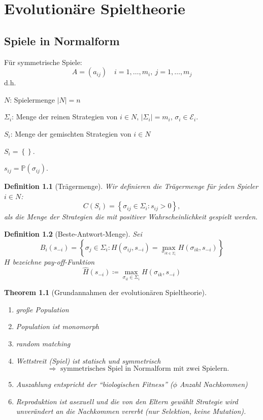 \documentclass[12pt]{extreport} %
\theoremstyle{named}
\newtheorem{unnamedtheorem}{Theorem} \counterwithin{unnamedtheorem}{chapter}
\theoremstyle{itshape}
\newtheorem*{definition}{Definition}
\theoremstyle{normal}
\begin{document}
\chapter{Evolutionäre Spieltheorie}

  
\section{Spiele in Normalform}
Für symmetrische Spiele:
$$ A = \left( a_{ij} \right) \quad i = 1, \dotsc, m_{i}, ~ j = 1, \dotsc, m_{j} $$
d.h.
\begin{description}
	\item $N$: Spielermenge $|N| = n$
	\item $\Sigma_{i}$: Menge der reinen Strategien von $i \in N$, $\left| \Sigma_{i} \right| = m_{i}$, $\sigma_{i} \in \mathcal{E}_{i}$.
	\item $S_{i}$: Menge der gemischten Strategien von $i \in N$
		\begin{description}
			\item $S_{i} = \left\{ \right\}$.
			\item $s_{ij} = \mathds{P}(\sigma_{ij})$.
		\end{description}
\end{description}
  
\begin{definition}[Trägermenge] Wir definieren die Trägermenge für jeden Spieler $i \in N$:
	$$ C(S_{i}) = \left\{ \sigma_{ij} \in \Sigma_{i} : s_{ij} > 0 \right\}, $$
	als die Menge der Strategien die mit positiver Wahrscheinlichkeit gespielt werden.
\end{definition}  

\begin{definition}[Beste-Antwort-Menge] Sei
	$$ B_{i}(s_{-i}) = \left\{ \sigma_{j} \in \Sigma_{i} : H(\sigma_{ij}, s_{-i}) = \max_{\sigma_{ik \in \Sigma_{i}}} H(\sigma_{ik}, s_{-i}) \right\} $$ 
	$H$ bezeichne pay-off-Funktion ~\\
	$$ \hat{H}(s_{-i}) \coloneqq \max_{\sigma_{il} \in \Sigma_{i}} H(\sigma_{ik}, s_{-i}) $$
\end{definition}


\begin{unnamedtheorem}[Grundannahmen der evolutionären Spieltheorie]
	\begin{enumerate}
		\item große Population
		\item Population ist monomorph
		\item random matching
		\item Wettstreit (Spiel) ist statisch und symmetrisch
			$$ \Rightarrow \text{ symmetrisches Spiel in Normalform mit zwei Spielern}. $$
		\item Auszahlung entspricht der \enquote{biologischen Fitness} ($\phi$ Anzahl Nachkommen)
		\item Reproduktion ist asexuell und die von den Eltern gewählt Strategie wird unverändert an die Nachkommen vererbt (nur Selektion, keine Mutation).
	\end{enumerate}
\end{unnamedtheorem} 
 
\end{document}
